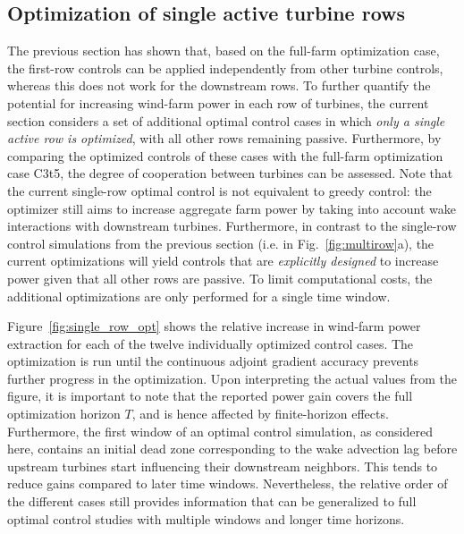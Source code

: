 \documentclass[wes, manuscript]{copernicus}
\begin{document}
\subsection{Optimization of single active turbine rows}\label{sec:optimization_single}
The previous section has shown that, based on the full-farm optimization case, the first-row controls can be applied independently from other turbine controls, whereas this does not work for the downstream rows. To further quantify the potential for increasing wind-farm power in each row of turbines, the current section considers a set of additional optimal control cases in which \emph{only a single active row is optimized}, with all other rows remaining passive. Furthermore, by comparing the optimized controls of these cases with the full-farm optimization case C3t5, the degree of cooperation between turbines can be assessed. Note that the current single-row optimal control is not equivalent to greedy control: the optimizer still aims to increase aggregate farm power by taking into account wake interactions with downstream turbines. Furthermore, in contrast to the single-row control simulations from the previous section (i.e. in Fig.~\ref{fig:multirow}a), the current optimizations will yield controls that are \emph{explicitly designed} to increase power given that all other rows are passive. To limit computational costs, the additional optimizations are only performed for a single time window. 

Figure~\ref{fig:single_row_opt} shows the relative increase in wind-farm power extraction for each of the twelve individually optimized control cases. The optimization is run until the continuous adjoint gradient accuracy prevents further progress in the optimization. Upon interpreting the actual values from the figure, it is important to note that the reported power gain covers the full optimization horizon $T$, and is hence affected by finite-horizon effects. Furthermore, the first window of an optimal control simulation, as considered here, contains an initial dead zone corresponding to the wake advection lag before upstream turbines start influencing their downstream neighbors. This tends to reduce gains compared to later time windows. Nevertheless, the relative order of the different cases still provides information that can be generalized to full optimal control studies with multiple windows and longer time horizons. 
\end{document}
